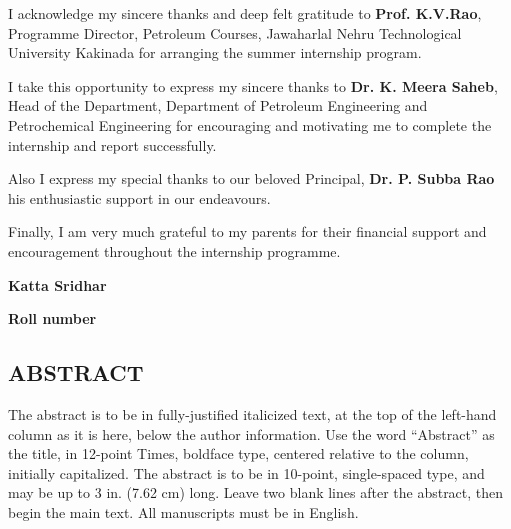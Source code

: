 \documentclass[11pt,a4paper]{report}
\begin{document}
\vspace{1em}


I acknowledge my sincere thanks and deep felt gratitude to \textbf{Prof. K.V.Rao}, Programme Director, Petroleum Courses, Jawaharlal Nehru Technological University Kakinada for arranging the summer internship program.

\vspace{1em}

I take this opportunity to express my sincere thanks to \textbf{Dr. K. Meera Saheb}, Head of the Department, Department of Petroleum Engineering and Petrochemical Engineering for encouraging and motivating me to complete the internship and report successfully.

\vspace{1em}

Also I express my special thanks to our beloved Principal, \textbf{Dr. P. Subba Rao} his enthusiastic support in our endeavours.

\vspace{1em}

Finally, I am very much grateful to my parents for their financial support and encouragement throughout the internship programme.

\vspace{1em}

\hfill \textbf{Katta Sridhar}

\hfill \textbf{Roll number} \hspace{0.005\textwidth}
        
\newpage        
\tableofcontents



\newpage

\begin{center}
\section*{ABSTRACT}
\end{center}
  
The abstract is to be in fully-justified italicized text, at the top of the left-hand column as it is here, below the author information. Use the word “Abstract” as the title, in 12-point Times, boldface type, centered relative to the column, initially capitalized. The abstract is to be in 10-point, single-spaced type, and may be up to 3 in. (7.62 cm) long. Leave two blank lines after the abstract, then begin the main text. All manuscripts must be in English.
  
\end{document}

